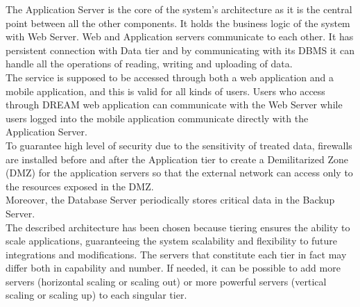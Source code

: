 The Application Server is the core of the system’s architecture as it is the central point between all the other components. It holds the business logic of the system with Web Server. Web and Application servers communicate to each other. It has persistent connection with Data tier and by communicating with its DBMS it can handle all the operations of reading, writing and uploading of data.\\

The service is supposed to be accessed through both a web application and a mobile application, and this is valid for all kinds of users. Users who access through DREAM web application can communicate with the Web Server while users logged into the mobile application communicate directly with the Application Server.\\

To guarantee high level of security due to the sensitivity of treated data, firewalls are installed before and after the Application tier to create a Demilitarized Zone (DMZ) for the application servers so that the external network can access only to the resources exposed in the DMZ. \\
Moreover, the Database Server periodically stores critical data in the Backup Server. \\

The described architecture has been chosen because tiering ensures the ability to scale applications, guaranteeing the system scalability and flexibility to future integrations and modifications.
The servers that constitute each tier in fact may differ both in capability and number. If needed, it can be possible to add more servers (horizontal scaling or scaling out) or more powerful servers (vertical scaling or scaling up) to each singular tier.  

\newpage